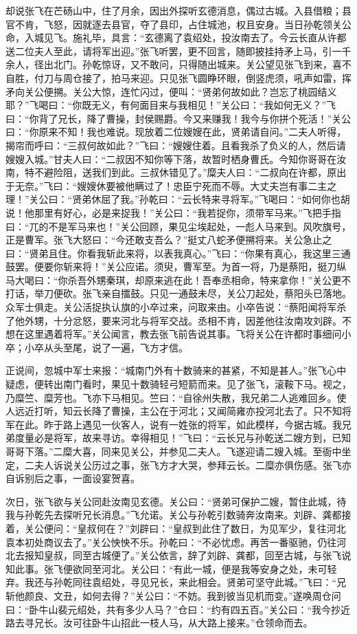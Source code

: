 却说张飞在芒砀山中，住了月余，因出外探听玄德消息，偶过古城。入县借粮；县官不肯，飞怒，因就逐去县官，夺了县印，占住城池，权且安身。当日孙乾领关公命，入城见飞。施礼毕，具言：“玄德离了袁绍处，投汝南去了。今云长直从许都送二位夫人至此，请将军出迎。”张飞听罢，更不回言，随即披挂持矛上马，引一千余人，径出北门。孙乾惊讶，又不敢问，只得随出城来。关公望见张飞到来，喜不自胜，付刀与周仓接了，拍马来迎。只见张飞圆睁环眼，倒竖虎须，吼声如雷，挥矛向关公便搠。关公大惊，连忙闪过，便叫：“贤弟何故如此？岂忘了桃园结义耶？”飞喝曰：“你既无义，有何面目来与我相见！”关公曰：“我如何无义？”飞曰：“你背了兄长，降了曹操，封侯赐爵。今又来赚我！我今与你拼个死活！”关公曰：“你原来不知！我也难说。现放着二位嫂嫂在此，贤弟请自问。”二夫人听得，揭帘而呼曰：“三叔何故如此？”飞曰：“嫂嫂住着。且看我杀了负义的人，然后请嫂嫂入城。”甘夫人曰：“二叔因不知你等下落，故暂时栖身曹氏。今知你哥哥在汝南，特不避险阻，送我们到此。三叔休错见了。”糜夫人曰：“二叔向在许都，原出于无奈。”飞曰：“嫂嫂休要被他瞒过了！忠臣宁死而不辱。大丈夫岂有事二主之理！”关公曰：“贤弟休屈了我。”孙乾曰：“云长特来寻将军。”飞喝曰：“如何你也胡说！他那里有好心，必是来捉我！”关公曰：“我若捉你，须带军马来。”飞把手指曰：“兀的不是军马来也！”关公回顾，果见尘埃起处，一彪人马来到。风吹旗号，正是曹军。张飞大怒曰：“今还敢支吾么？”挺丈八蛇矛便搠将来。关公急止之曰：“贤弟且住。你看我斩此来将，以表我真心。”飞曰：“你果有真心，我这里三通鼓罢。便要你斩来将！”关公应诺。须臾，曹军至。为首一将，乃是蔡阳，挺刀纵马大喝曰：“你杀吾外甥秦琪，却原来逃在此！吾奉丞相命，特来拿你！”关公更不打话，举刀便砍。张飞亲自擂鼓。只见一通鼓未尽，关公刀起处，蔡阳头已落地。众军士俱走。关公活捉执认旗的小卒过来，问取来由。小卒告说：“蔡阳闻将军杀了他外甥，十分忿怒，要来河北与将军交战。丞相不肯，因差他往汝南攻刘辟。不想在这里遇着将军。”关公闻言，教去张飞前告说其事。飞将关公在许都时事细问小卒；小卒从头至尾，说了一遍，飞方才信。

正说间，忽城中军士来报：“城南门外有十数骑来的甚紧，不知是甚人。”张飞心中疑虑，便转出南门看时，果见十数骑轻弓短箭而来。见了张飞，滚鞍下马。视之，乃糜竺、糜芳也。飞亦下马相见。竺曰：“自徐州失散，我兄弟二人逃难回乡。使人远近打听，知云长降了曹操，主公在于河北；又闻简雍亦投河北去了。只不知将军在此。昨于路上遇见一伙客人，说有一姓张的将军，如此模样，今据古城。我兄弟度量必是将军，故来寻访。幸得相见！”飞曰：“云长兄与孙乾送二嫂方到，已知哥哥下落。”二糜大喜，同来见关公，并参见二夫人。飞遂迎请二嫂入城。至衙中坐定，二夫人诉说关公历过之事，张飞方才大哭，参拜云长。二糜亦俱伤感。张飞亦自诉别后之事，一面设宴贺喜。

次日，张飞欲与关公同赴汝南见玄德。关公曰：“贤弟可保护二嫂，暂住此城，待我与孙乾先去探听兄长消息。”飞允诺。关公与孙乾引数骑奔汝南来。刘辟、龚都接着，关公便问：“皇叔何在？”刘辟曰：“皇叔到此住了数日，为见军少，复往河北袁本初处商议去了。”关公怏怏不乐。孙乾曰：“不必忧虑。再苦一番驱驰，仍往河北去报知皇叔，同至古城便了。”关公依言，辞了刘辟、龚都，回至古城，与张飞说知此事。张飞便欲同至河北。关公曰：“有此一城，便是我等安身之处，未可轻弃。我还与孙乾同往袁绍处，寻见兄长，来此相会。贤弟可坚守此城。”飞曰：“兄斩他颜良、文丑，如何去得？”关公曰：“不妨。我到彼当见机而变。”遂唤周仓问曰：“卧牛山裴元绍处，共有多少人马？”仓曰：“约有四五百。”关公曰：“我今抄近路去寻兄长。汝可往卧牛山招此一枝人马，从大路上接来。”仓领命而去。

